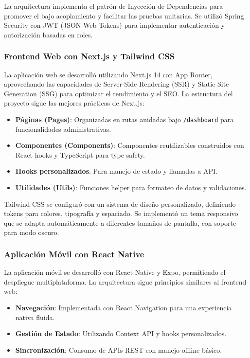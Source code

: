 La arquitectura implementa el patrón de Inyección de Dependencias para promover el bajo acoplamiento y facilitar las pruebas unitarias. Se utilizó Spring Security con JWT (JSON Web Tokens) para implementar autenticación y autorización basadas en roles.

\subsubsection{Frontend Web con Next.js y Tailwind CSS}

La aplicación web se desarrolló utilizando Next.js 14 con App Router, aprovechando las capacidades de Server-Side Rendering (SSR) y Static Site Generation (SSG) para optimizar el rendimiento y el SEO. La estructura del proyecto sigue las mejores prácticas de Next.js:

\begin{itemize}
\item \textbf{Páginas (Pages)}: Organizadas en rutas anidadas bajo \texttt{/dashboard} para funcionalidades administrativas.
\item \textbf{Componentes (Components)}: Componentes reutilizables construidos con React hooks y TypeScript para type safety.
\item \textbf{Hooks personalizados}: Para manejo de estado y llamadas a API.
\item \textbf{Utilidades (Utils)}: Funciones helper para formateo de datos y validaciones.
\end{itemize}

Tailwind CSS se configuró con un sistema de diseño personalizado, definiendo tokens para colores, tipografía y espaciado. Se implementó un tema responsivo que se adapta automáticamente a diferentes tamaños de pantalla, con soporte para modo oscuro.

\subsubsection{Aplicación Móvil con React Native}

La aplicación móvil se desarrolló con React Native y Expo, permitiendo el despliegue multiplataforma. La arquitectura sigue principios similares al frontend web:

\begin{itemize}
\item \textbf{Navegación}: Implementada con React Navigation para una experiencia nativa fluida.
\item \textbf{Gestión de Estado}: Utilizando Context API y hooks personalizados.
\item \textbf{Sincronización}: Consumo de APIs REST con manejo offline básico.
\end{itemize}

